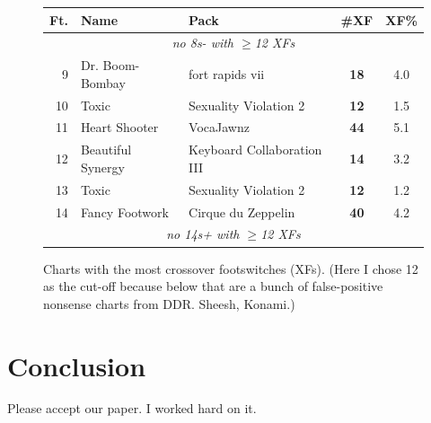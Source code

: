\documentclass[10pt]{sigplanconf}
\begin{document}
\begin{figure}[t]
	\begin{center}
		\small
	\begin{tabular}{r|l|l|c|c}
		\bf Ft. & \bf Name & \bf Pack & \bf \#XF & \bf XF\% \\
		\hline
		\multicolumn{5}{c}{\em no 8s- with $\ge$12 XFs} \\
		 9 & Dr. Boom-Bombay   & fort rapids vii            & \bf 18 & 4.0 \\
		10 & Toxic             & Sexuality Violation 2      & \bf 12 & 1.5 \\
		11 & Heart Shooter     & VocaJawnz                  & \bf 44 & 5.1 \\
		12 & Beautiful Synergy & Keyboard Collaboration III & \bf 14 & 3.2 \\
		13 & Toxic             & Sexuality Violation 2      & \bf 12 & 1.2 \\
		14 & Fancy Footwork    & Cirque du Zeppelin         & \bf 40 & 4.2 \\
		\multicolumn{5}{c}{\em no 14s+ with $\ge$12 XFs} \\
	\end{tabular}
	\end{center}
	\caption{Charts with the most crossover footswitches (XFs). (Here I chose 12 as the cut-off because below that are a bunch of false-positive nonsense charts from DDR. Sheesh, Konami.)}
\end{figure}

\section{Conclusion}

Please accept our paper.
I worked hard on it.




\end{document}
